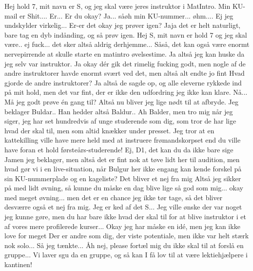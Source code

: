 \documentclass[a4paper,11pt]{article}
\begin{document}
\begin{sketch}
 Hej hold 7, mit navn er S, og jeg skal være jeres instruktor i MatIntro. Min KU-mail er 
  Shit.... 
 Er... Er du okay?
 Ja...  såøh min KU-nummer... øhm.... Ej jeg undskylder virkelig... Er-er det okay jeg prøver igen?
 Jaja det er helt naturligt, bare tag en dyb indånding, og så prøv igen.
 Hej S, mit navn er hold 7 og jeg skal være.. ej fuck... det sker altså aldrig derhjemme...
 Såså, det kan også være enormt nervepirrende at skulle starte en matintro øvelsestime.
 Ja altså jeg kan huske da jeg selv var instruktor. Ja okay dér gik det rimelig fucking godt, men nogle af de andre instruktorer havde enormt svært ved det, men altså alt endte jo fint
 Hvad gjorde de andre instruktorer?
 Ja altså de sagde op, og alle eleverne rykkede ind på mit hold, men det var fint, der er ikke den udfordring jeg ikke kan klare.
 Nå... Må jeg godt prøve én gang til?
 Altså nu bliver jeg lige nødt til at afbryde. Jeg beklager Buldar..
 Han hedder altså Baldur..
 Ah Balder, men tro mig når jeg siger, jeg har set hundredvis af unge studerende som dig, som tror de har lige hvad der skal til, men som altid knækker under presset. Jeg tror at en kattekilling ville have mere held med at instruere frømandskorpset end du ville have foran et hold førsteårs-studerende!
 Ej, D1, det kan du da ikke bare sige
 Jamen jeg beklager, men altså det er fint nok at tøve lidt her til audition, men hvad gør vi i en live-situation, når Bulgur her ikke engang kan kende forskel på sin KU-nummerplade og en kageliste? Det bliver et nej fra mig
 Altså jeg sikker på med lidt øvning, så kunne du måske en dag blive lige så god som mig... okay med meget øvning... men det er en chance jeg ikke tør tage, så det bliver desværre også et nej fra mig.
 Jeg er ked af det S... Jeg ville ønske der var noget jeg kunne gøre, men du har bare ikke hvad der skal til for at blive instruktor i et af vores mere profilerede kurser...
 Okay jeg har måske en idé, men jeg kan ikke love for meget
 Der er andre som dig, der viste potentiale, men ikke var helt stærk nok solo... Så jeg tænkte...
 Åh nej, please fortæl mig du ikke skal til at forslå en gruppe...
 Vi laver sgu da en gruppe, og så kan I få lov til at være lektiehjælpere i kantinen!
\end{sketch}
\end{document}
